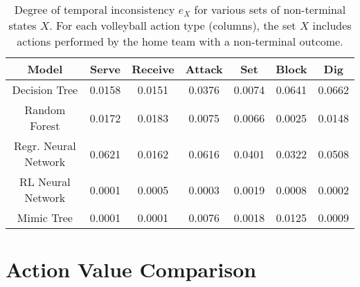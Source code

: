 \documentclass{sfuthesis}
\begin{document}
	\begin{table}
		\centering
		\begin{tabular}{c|cccccc}
			\textbf{Model}    & \textbf{Serve} & \textbf{Receive} & \textbf{Attack} & \textbf{Set} & \textbf{Block} & \textbf{Dig} \\ \hline
			Decision Tree     & 0.0158                  & 0.0151                    & 0.0376                   & 0.0074                & 0.0641                  & 0.0662                \\
			Random Forest     & 0.0172                  & 0.0183                    & 0.0075                   & 0.0066                & 0.0025                  & 0.0148                \\
			Regr. Neural Network & 0.0621                  & 0.0162                    & 0.0616                   & 0.0401                & 0.0322                 & 0.0508                \\
			RL Neural Network & 0.0001                  & 0.0005                    & 0.0003                   & 0.0019                & 0.0008                  & 0.0002                \\
			Mimic Tree        & 0.0001                  & 0.0001                    & 0.0076                   & 0.0018                & 0.0125                  & 0.0009               
		\end{tabular}
		\caption{Degree of temporal inconsistency $e_X$ for various sets of non-terminal states $X$. For each volleyball action type (columns), the set $X$ includes actions performed by the home team with a non-terminal outcome.}
		\label{tab:bellman-agreement}
	\end{table}
	
	\section{Action Value Comparison}
	
\end{document}
